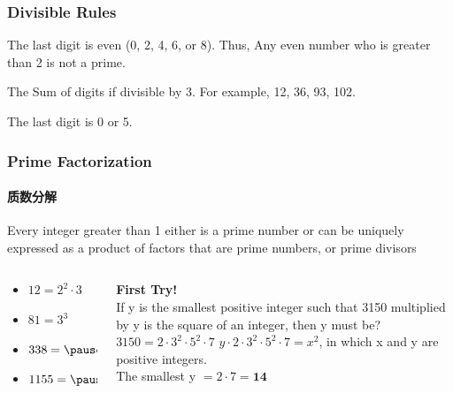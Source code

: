 \documentclass[
	11pt, %
]{beamer}
\begin{document}
\begin{frame}
	\frametitle{Divisible Rules}
	
	\begin{theorem}[Divisible by 2]
		The last digit is even (0, 2, 4, 6, or 8). Thus, Any even number who is greater than 2 is not a prime.
	\end{theorem}
	
	\begin{theorem}[Divisible by 3]
		The Sum of digits if  divisible by 3. For example, 12, 36, 93, 102.
	\end{theorem}

	\begin{theorem}[Divisible by 5]
		The last digit is 0 or 5.
	\end{theorem}
\end{frame}


\begin{frame}
	\frametitle{Prime Factorization}
	\framesubtitle{质数分解}
	
	\begin{theorem}
		Every integer greater than 1 either is a prime number or can be \alert{uniquely} expressed as a product of factors that are prime numbers, or prime divisors
	\end{theorem}
	
	\smallskip %
	
		\begin{columns}[c] %
		\begin{column}{0.45\textwidth} %
				\begin{example}
		\begin{itemize}
			\item $12 = 2^2 \cdot 3$
			\item $81 = 3^3$
			\item $338 = \pause 2 \cdot 13^2$
			\item $1155 = \pause 3\cdot 5 \cdot 7 \cdot 11$
		\end{itemize}
	\end{example}
		\end{column}
		\begin{column}{0.5\textwidth} %
		\textbf{First Try!}\\
		 If y is the smallest positive integer such that 3150 multiplied by y is the
square of an integer, then y must be? \\
\smallskip
\pause
$3150= 2 \cdot 3^2 \cdot 5^2 \cdot 7$
\pause
$y \cdot 2 \cdot 3^2 \cdot 5^2 \cdot 7  = x^2$, in which x and y are positive integers.\\
The smallest y $= 2 \cdot 7 = \textbf{14}$\\
		\end{column}
	\end{columns}
\end{frame}
\end{document}
